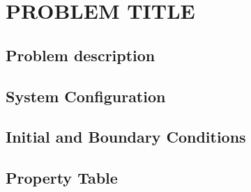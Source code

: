 \section{PROBLEM TITLE} %

\subsection{Problem description}

\subsection{System Configuration}


\subsection{Initial and Boundary Conditions}


\subsection{Property Table}

